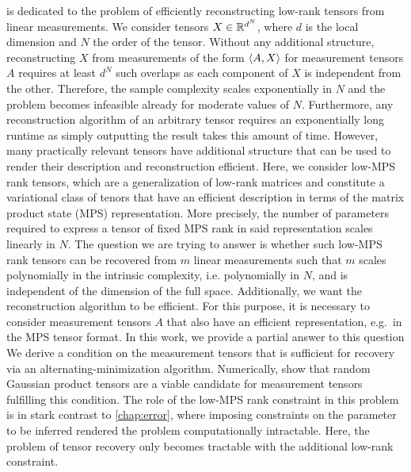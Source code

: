  is dedicated to the problem of efficiently reconstructing low-rank tensors from linear measurements.
We consider tensors $X \in {\mathbb{R}}^{d^N}$, where $d$ is the local dimension and $N$ the order of the tensor.
Without any additional structure, reconstructing $X$ from measurements of the form  $\braket{A, X}$ for measurement tensors $A$ requires at least $d^N$ such overlaps as each component of $X$ is independent from the other.
Therefore, the sample complexity scales exponentially in $N$ and the problem becomes infeasible already for moderate values of $N$.
Furthermore, any reconstruction algorithm of an arbitrary tensor requires an exponentially long runtime as simply outputting the result takes this amount of time.
However, many practically relevant tensors have additional structure that can be used to render their description and reconstruction efficient.
Here, we consider low-MPS rank tensors, which are a generalization of low-rank matrices and constitute a variational class of tenors that have an efficient description in terms of the matrix product state (MPS) representation.
More precisely, the number of parameters required to express a tensor of fixed MPS rank in said representation scales linearly in $N$.
The question we are trying to answer is whether such low-MPS rank tensors can be recovered from $m$ linear measurements such that $m$ scales polynomially in the intrinsic complexity, i.e.
 polynomially in $N$, and is independent of the dimension of the full space.
Additionally, we want the reconstruction algorithm to be efficient.
For this purpose, it is necessary to consider measurement tensors $A$ that also have an efficient representation, e.g.\ in the MPS tensor format.
In this work, we provide a partial answer to this question
We derive a condition on the measurement tensors that is sufficient for recovery via an alternating-minimization algorithm.
Numerically, show that random Gaussian product tensors are a viable candidate for measurement tensors fulfilling this condition.
The role of the low-MPS rank constraint in this problem is in stark contrast to \cref{chap:error}, where imposing constraints on the parameter to be inferred rendered the problem computationally intractable.
Here, the problem of tensor recovery only becomes tractable with the additional low-rank constraint.
